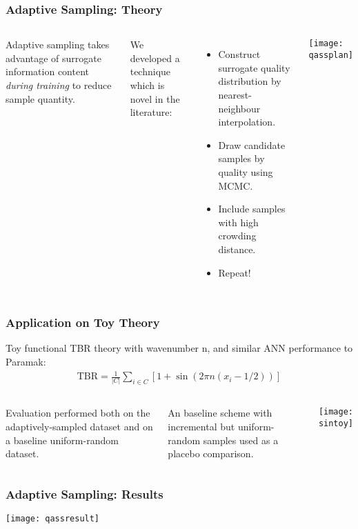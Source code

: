 \begin{frame}
	\frametitle{Adaptive Sampling: Theory}
	 \begin{columns}[onlytextwidth,T]
      \column{\dimexpr\linewidth-6cm-5mm}
        
        Adaptive sampling takes advantage of surrogate information content \textit{during training} to reduce sample quantity.\newline
        
        We developed a technique which is novel in the literature:
        \begin{itemize}
        \item Construct surrogate quality distribution by nearest- neighbour interpolation.
        \item Draw candidate samples by quality using MCMC.
        \item Include samples with high crowding distance.
        \item Repeat!
        \end{itemize}
      \column{6cm}
      \texttt{[image: qassplan]}

    \end{columns}
\end{frame}

\begin{frame}
	\frametitle{Application on Toy Theory}
	Toy functional TBR theory with wavenumber n, and similar ANN performance to Paramak:
	\begin{align*}
		\text{TBR} = \frac{1}{|C|}\sum_{i \in C} \left[1 + \sin(2\pi n (x_i - 1/2)) \right]
	\end{align*}

	\vspace{1em}

	\begin{columns}[T]
		\column{0.5\paperwidth}
		\vspace{0.5em}
		Evaluation performed both on the adaptively-sampled dataset and on a baseline uniform-random dataset.\newline

		An baseline scheme with incremental but uniform-random samples used as a placebo comparison.


		\column{0.4\paperwidth}
		\texttt{[image: sintoy]}

	\end{columns}
\end{frame}

\begin{frame}
    \frametitle{Adaptive Sampling: Results}
    
    \begin{center}
    \texttt{[image: qassresult]}
    \end{center}

\end{frame}
